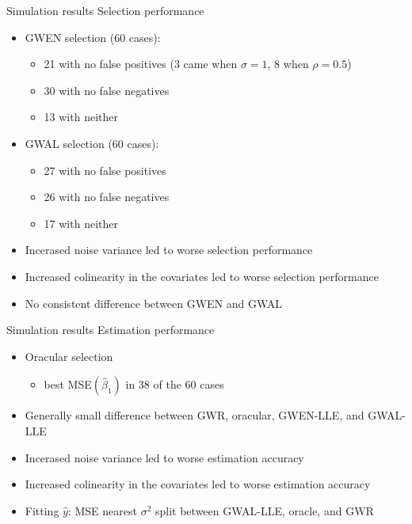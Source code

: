 \documentclass[12pt,t,handout]{beamer}
\newcommand{\subt}[1]{{\footnotesize \color{subtitle} {#1}}}
\begin{document}
\begin{frame}{Simulation results}
\subt{Selection performance}

\bigskip
\begin{itemize}
  \item GWEN selection (60 cases):
  \begin{itemize}
    \item 21 with no false positives (3 came when $\sigma = 1$, 8 when $\rho = 0.5$)
    \item 30 with no false negatives 
    \item 13 with neither
  \end{itemize}

  \item GWAL selection (60 cases):
  \begin{itemize}
    \item 27 with no false positives
    \item 26 with no false negatives
    \item 17 with neither
  \end{itemize}

  \item Incerased noise variance led to worse selection performance
  \item Increased colinearity in the covariates led to worse selection performance
  \item No consistent difference between GWEN and GWAL
\end{itemize}

\end{frame}



	
	
\begin{frame}{Simulation results}
\subt{Estimation performance}


\begin{itemize}
  \item Oracular selection
  \begin{itemize}
    \item best MSE$(\hat{\beta}_1)$ in 38 of the 60 cases
  \end{itemize}

  \item Generally small difference between GWR, oracular, GWEN-LLE, and GWAL-LLE\
  \item Incerased noise variance led to worse estimation accuracy
  \item Increased colinearity in the covariates led to worse estimation accuracy
  \item Fitting $\hat{y}$: MSE nearest $\sigma^2$ split between GWAL-LLE, oracle, and GWR
\end{itemize}
\end{frame}
	
\end{document}
